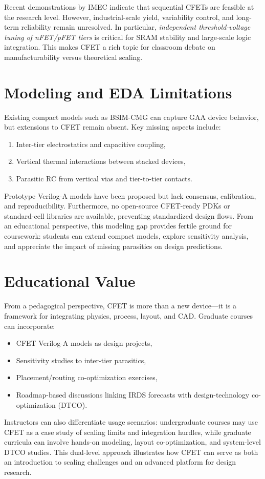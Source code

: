 \documentclass[conference]{IEEEtran}
\begin{document}
Recent demonstrations by IMEC indicate that sequential CFETs are feasible at the research level.
However, industrial-scale yield, variability control, and long-term reliability remain unresolved.
In particular, \emph{independent threshold-voltage tuning of nFET/pFET tiers} is critical for SRAM stability and large-scale logic integration.
This makes CFET a rich topic for classroom debate on manufacturability versus theoretical scaling.

\section{Modeling and EDA Limitations}
Existing compact models such as BSIM-CMG can capture GAA device behavior, but extensions to CFET remain absent.
Key missing aspects include:
\begin{enumerate}
  \item Inter-tier electrostatics and capacitive coupling,
  \item Vertical thermal interactions between stacked devices,
  \item Parasitic RC from vertical vias and tier-to-tier contacts.
\end{enumerate}
Prototype Verilog-A models have been proposed but lack consensus, calibration, and reproducibility.
Furthermore, no open-source CFET-ready PDKs or standard-cell libraries are available, preventing standardized design flows.
From an educational perspective, this modeling gap provides fertile ground for coursework:
students can extend compact models, explore sensitivity analysis, and appreciate the impact of missing parasitics on design predictions.

\section{Educational Value}
From a pedagogical perspective, CFET is more than a new device—it is a framework for integrating physics, process, layout, and CAD.
Graduate courses can incorporate:
\begin{itemize}
  \item CFET Verilog-A models as design projects,
  \item Sensitivity studies to inter-tier parasitics,
  \item Placement/routing co-optimization exercises,
  \item Roadmap-based discussions linking IRDS forecasts with design-technology co-optimization (DTCO).
\end{itemize}
Instructors can also differentiate usage scenarios:
undergraduate courses may use CFET as a case study of scaling limits and integration hurdles,
while graduate curricula can involve hands-on modeling, layout co-optimization, and system-level DTCO studies.
This dual-level approach illustrates how CFET can serve as both an introduction to scaling challenges and an advanced platform for design research.
\end{document}
